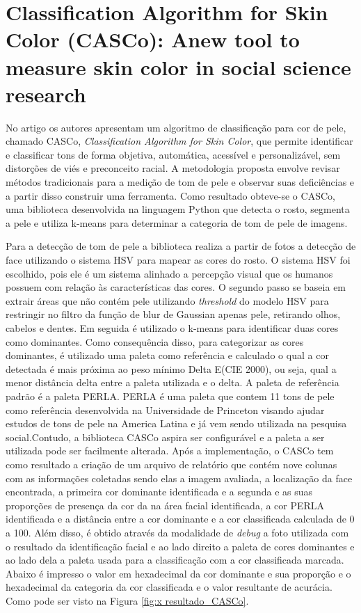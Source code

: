 \section{Classification Algorithm for Skin Color (CASCo): Anew tool to measure skin color in social science research}
No artigo \cite{Classification_Algorithm_for_Skin_Color_CASCo_A_new_tool} os autores apresentam um algoritmo de classificação para cor de pele, chamado CASCo, \textit{Classification Algorithm for Skin Color},  que permite identificar e classificar tons de forma objetiva, automática, acessível e personalizável, sem distorções de viés e preconceito racial. A metodologia proposta envolve revisar métodos tradicionais para a medição de tom de pele e observar suas deficiências e a partir disso construir uma ferramenta. Como resultado obteve-se o CASCo, uma biblioteca desenvolvida na linguagem Python que detecta o rosto, segmenta a pele e utiliza k-means para determinar a categoria de tom de pele de imagens.  

Para a detecção de tom de pele a biblioteca realiza a partir de fotos a detecção de face utilizando o sistema HSV para mapear as cores do rosto. O sistema HSV foi escolhido, pois ele é um sistema alinhado a percepção visual que os humanos possuem com relação às características das cores. 
O segundo passo se baseia em extrair áreas que não contém pele utilizando \textit{threshold} do modelo HSV para restringir no filtro da função de blur de Gaussian apenas pele, retirando olhos, cabelos e dentes. Em seguida é utilizado o k-means para identificar duas cores como dominantes.
Como consequência disso, para categorizar as cores dominantes, é utilizado uma paleta como referência e calculado o qual a cor detectada é mais próxima ao peso mínimo Delta E(CIE 2000), ou seja, qual a menor distância delta entre a paleta utilizada e o delta.
A paleta de referência padrão é a paleta PERLA. PERLA é uma paleta que contem 11 tons de pele como referência desenvolvida na Universidade de Princeton visando ajudar estudos de tons de pele na America Latina e já vem sendo utilizada na pesquisa social.Contudo, a biblioteca CASCo aspira ser configurável e a paleta a ser utilizada pode ser facilmente alterada.
Após a implementação, o CASCo tem como resultado a criação de um arquivo de relatório que contém nove colunas com as informações coletadas sendo elas a imagem avaliada, a localização da face encontrada, a primeira cor dominante identificada e a segunda e as suas proporções de presença da cor da na área facial identificada, a cor PERLA identificada e a distância entre a cor dominante e a cor classificada calculada de 0 a 100. Além disso, é obtido através da modalidade de \textit{debug} a foto utilizada com o resultado da identificação facial e ao lado direito a paleta de cores dominantes e ao lado dela a paleta usada para a classificação com a cor classificada marcada. Abaixo é impresso o valor em hexadecimal da cor dominante e sua proporção e o hexadecimal da categoria da cor classificada e o valor resultante de acurácia. Como pode ser visto na Figura \ref{fig:x resultado_CASCo}.


